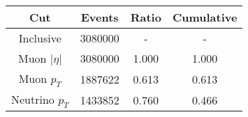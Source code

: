 \begin{tabular}{|c||c|c|c|}
\hline
Cut & Events & Ratio & Cumulative \\\hline
Inclusive & 3080000 & - & - \\
Muon $|\eta|$ & 3080000 & 1.000 & 1.000 \\
Muon $p_{T}$ & 1887622 & 0.613 & 0.613 \\
Neutrino $p_{T}$ & 1433852 & 0.760 & 0.466 \\
\end{tabular}